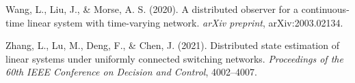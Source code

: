 \documentclass[twocolumn]{autart}
\begin{document}
\begin{thebibliography}{99}
Wang, L., Liu, J., \&  Morse, A. S. (2020).
\newblock A distributed observer for a continuous-time linear system with time-varying network.
\newblock  \emph{arXiv preprint}, arXiv:2003.02134.


%
%
Zhang, L., Lu, M., Deng,  F., \& Chen, J. (2021).
\newblock Distributed state estimation of linear systems under uniformly connected switching networks.
\newblock \emph{Proceedings of the 60th IEEE Conference on Decision and Control}, 4002--4007.

\end{thebibliography}




\end{document}
